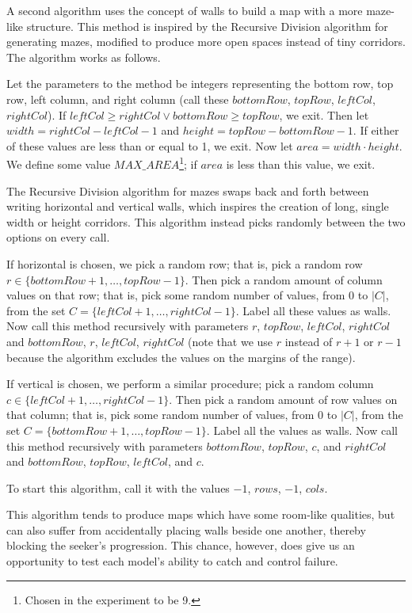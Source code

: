 \documentclass[12pt]{article}
\begin{document}
A second algorithm uses the concept of walls to build a map with a more maze-like structure. This method is inspired by the Recursive Division algorithm for generating mazes, modified to produce more open spaces instead of tiny corridors\cite{Mazes}. The algorithm works as follows.

Let the parameters to the method be integers representing the bottom row, top row, left column, and right column (call these $ bottomRow $, $ topRow $, $ leftCol $, $ rightCol $). If $ leftCol \geq rightCol \lor bottomRow \geq topRow $, we exit. Then let $ width = rightCol - leftCol - 1 $ and $ height = topRow - bottomRow - 1 $. If either of these values are less than or equal to 1, we exit. Now let $ area = width \cdot height $. We define some value $ MAX\_AREA $\footnote{Chosen in the experiment to be 9.}; if $ area $ is less than this value, we exit. 

The Recursive Division algorithm for mazes swaps back and forth between writing horizontal and vertical walls, which inspires the creation of long, single width or height corridors. This algorithm instead picks randomly between the two options on every call. 

If horizontal is chosen, we pick a random row; that is, pick a random row $ r \in \{ bottomRow+1, \ldots, topRow - 1 \} $. Then pick a random amount of column values on that row; that is, pick some random number of values, from 0 to $ \left|C\right| $, from the set $ C = \{ leftCol+1, \ldots, rightCol - 1 \} $. Label all these values as walls. Now call this method recursively with parameters $ r $, $ topRow $, $ leftCol $, $ rightCol $ and $ bottomRow $, $ r $, $ leftCol $, $ rightCol $ (note that we use $ r $ instead of $ r + 1 $ or $ r - 1 $ because the algorithm excludes the values on the margins of the range). 

If vertical is chosen, we perform a similar procedure; pick a random column $ c \in \{ leftCol + 1, \ldots, rightCol - 1 \} $. Then pick a random amount of row values on that column; that is, pick some random number of values, from 0 to $ \left|C\right| $, from the set $ C = \{ bottomRow + 1, \ldots, topRow - 1 \} $. Label all the values as walls. Now call this method recursively with parameters $ bottomRow $, $ topRow $, $ c $, and $ rightCol $ and $ bottomRow $, $ topRow $, $ leftCol $, and $ c $. 

To start this algorithm, call it with the values $ -1 $, $ rows $, $ -1 $, $ cols $.

This algorithm tends to produce maps which have some room-like qualities, but can also suffer from accidentally placing walls beside one another, thereby blocking the seeker's progression. This chance, however, does give us an opportunity to test each model's ability to catch and control failure. 
\end{document}
